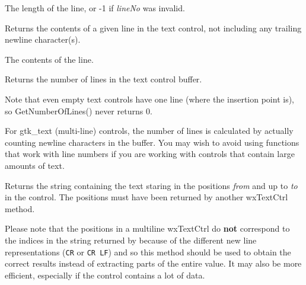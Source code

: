 The length of the line, or -1 if {\it lineNo} was invalid.


\label{wxtextctrlgetlinetext}


Returns the contents of a given line in the text control, not including
any trailing newline character(s).




The contents of the line.


\label{wxtextctrlgetnumberoflines}


Returns the number of lines in the text control buffer.


Note that even empty text controls have one line (where the insertion point
is), so GetNumberOfLines() never returns 0.

For gtk\_text (multi-line) controls, the number of lines is
calculated by actually counting newline characters in the buffer. You
may wish to avoid using functions that work with line numbers if you are
working with controls that contain large amounts of text.


\label{wxtextctrlgetrange}


Returns the string containing the text staring in the positions {\it from} and
up to {\it to} in the control. The positions must have been returned by another
wxTextCtrl method.

Please note that the positions in a multiline wxTextCtrl do {\bf not}
correspond to the indices in the string returned by 
 because of the different new line
representations ({\tt CR} or {\tt CR LF}) and so this method should be used to
obtain the correct results instead of extracting parts of the entire value. It
may also be more efficient, especially if the control contains a lot of data.


\label{wxtextctrlgetselection}

